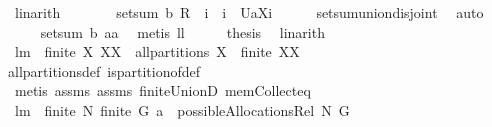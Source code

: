 \begin{isabellebody}
\ linarith\isanewline
\ \ \isamarkupfalse%
\ \isamarkupfalse%
\ {\isachardoublequoteopen}{\isachardot}{\isachardot}{\isachardot}\ {\isacharequal}\ setsum\ b\ {\isacharparenleft}{\isacharquery}R\ {\isacharminus}{\isacharminus}\ i\ {\isasymunion}\ {\isacharparenleft}{\isacharbraceleft}i{\isacharbraceright}\ {\isasymtimes}\ {\isacharbraceleft}{\isacharquery}U{\isacharparenleft}a{\isacharbackquote}{\isacharbackquote}{\isacharparenleft}X{\isasymunion}{\isacharbraceleft}i{\isacharbraceright}{\isacharparenright}{\isacharparenright}{\isacharbraceright}{\isacharparenright}{\isacharparenright}{\isachardoublequoteclose}\ \isanewline
\ \ \isamarkupfalse%
\ {}\ setsum{\isachardot}union{\isacharunderscore}disjoint\ \isamarkupfalse%
\ auto\isanewline
\ \ \isamarkupfalse%
\ \isamarkupfalse%
\ {\isachardoublequoteopen}{\isachardot}{\isachardot}{\isachardot}\ {\isacharequal}\ setsum\ b\ {\isacharquery}aa{\isachardoublequoteclose}\ \isamarkupfalse%
\ {\isacharparenleft}metis\ ll{}{}{\isacharparenright}\isanewline
\ \ \isamarkupfalse%
\ \isamarkupfalse%
\ {\isacharquery}thesis\ \isamarkupfalse%
\ linarith\isanewline
{}\isamarkupfalse%
%
\endisatagproof
{\isafoldproof}%
%
\isadelimproof
\isanewline
%
\endisadelimproof
\isanewline
{}\isamarkupfalse%
\ lm{}{}{\isacharcolon}\ \ {\isachardoublequoteopen}finite\ X{\isachardoublequoteclose}\ {\isachardoublequoteopen}XX\ {\isasymin}\ all{\isacharunderscore}partitions\ X{\isachardoublequoteclose}\ \ {\isachardoublequoteopen}finite\ XX{\isachardoublequoteclose}%
\isadelimproof
\ %
\endisadelimproof
%
\isatagproof
{}\isamarkupfalse%
\ \isanewline
all{\isacharunderscore}partitions{\isacharunderscore}def\ is{\isacharunderscore}partition{\isacharunderscore}of{\isacharunderscore}def\ \isanewline
{}\isamarkupfalse%
\ {\isacharparenleft}metis\ assms{\isacharparenleft}{}{\isacharparenright}\ assms{\isacharparenleft}{}{\isacharparenright}\ finite{\isacharunderscore}UnionD\ mem{\isacharunderscore}Collect{\isacharunderscore}eq{\isacharparenright}%
\endisatagproof
{\isafoldproof}%
%
\isadelimproof
%
\endisadelimproof
\isanewline
\isanewline
{}\isamarkupfalse%
\ lm{}{}{\isacharcolon}\ \ {\isachardoublequoteopen}finite\ N{\isachardoublequoteclose}\ {\isachardoublequoteopen}finite\ G{\isachardoublequoteclose}\ {\isachardoublequoteopen}a\ {\isasymin}\ possibleAllocationsRel\ N\ G{\isachardoublequoteclose}\isanewline

\end{isabellebody}
